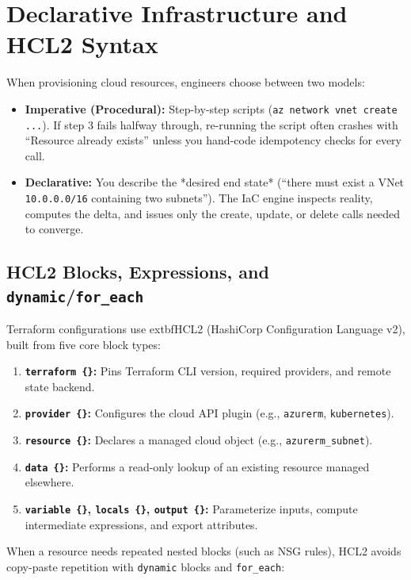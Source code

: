 \section{Declarative Infrastructure and HCL2 Syntax}

When provisioning cloud resources, engineers choose between two models:
\begin{itemize}[leftmargin=12pt]
  \item \textbf{Imperative (Procedural):} Step-by-step scripts (\texttt{az network vnet create ...}). If step 3 fails halfway through, re-running the script often crashes with ``Resource already exists'' unless you hand-code idempotency checks for every call.
  \item \textbf{Declarative:} You describe the *desired end state* (``there must exist a VNet \texttt{10.0.0.0/16} containing two subnets''). The IaC engine inspects reality, computes the delta, and issues only the create, update, or delete calls needed to converge.
\end{itemize}

\subsection{HCL2 Blocks, Expressions, and \texttt{dynamic}/\texttt{for\_each}}
Terraform configurations use 	extbf{HCL2 (HashiCorp Configuration Language v2)}, built from five core block types:
\begin{enumerate}[leftmargin=15pt]
  \item \textbf{\texttt{terraform \{\}}:} Pins Terraform CLI version, required providers, and remote state backend.
  \item \textbf{\texttt{provider \{\}}:} Configures the cloud API plugin (e.g., \texttt{azurerm}, \texttt{kubernetes}).
  \item \textbf{\texttt{resource \{\}}:} Declares a managed cloud object (e.g., \texttt{azurerm\_subnet}).
  \item \textbf{\texttt{data \{\}}:} Performs a read-only lookup of an existing resource managed elsewhere.
  \item \textbf{\texttt{variable \{\}}, \texttt{locals \{\}}, \texttt{output \{\}}:} Parameterize inputs, compute intermediate expressions, and export attributes.
\end{enumerate}

When a resource needs repeated nested blocks (such as NSG rules), HCL2 avoids copy-paste repetition with \texttt{dynamic} blocks and \texttt{for\_each}:

